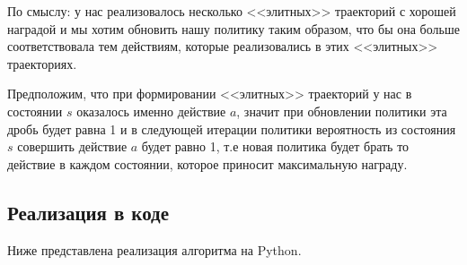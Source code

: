 По смыслу: у нас реализовалось несколько <<элитных>> траекторий с хорошей наградой и мы хотим обновить нашу политику таким образом, что бы она больше соответствовала тем действиям, которые реализовались в этих <<элитных>> траекториях.

Предположим, что при формировании <<элитных>> траекторий у нас в состоянии $s$ оказалось именно действие $a$, значит при обновлении политики эта дробь будет равна 1 и в следующей итерации политики вероятность из состояния $s$ совершить действие $a$ будет равно 1, т.е новая политика будет брать то действие в каждом состоянии, которое приносит максимальную награду.

\subsection{Реализация в коде}

Ниже представлена реализация алгоритма на Python.


